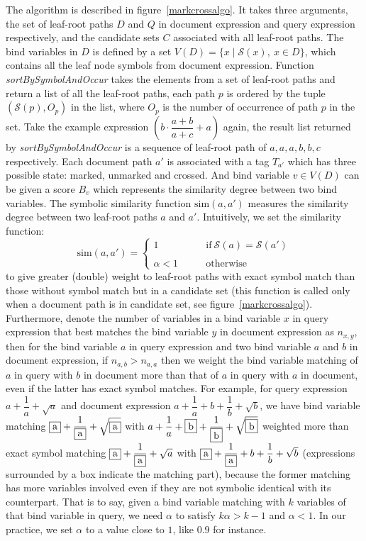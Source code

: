 The algorithm is described in figure~\ref{markcrossalgo}. It takes three arguments, the set of leaf-root paths $D$ and $Q$ in document expression and query expression respectively, and the candidate sets $C$ associated with all leaf-root paths. 
The bind variables in $D$ is defined by a set $V(D) = \{x \mid \mathcal{S}(x),\ x \in D\}$, which contains all the leaf node symbols from document expression.
Function \textit{sortBySymbolAndOccur} takes the elements from a set of leaf-root paths and return a list of all the leaf-root paths, each path $p$ is ordered by the tuple $(\mathcal{S}(p), O_p)$ in the list, where $O_p$ is the number of occurrence of path $p$ in the set. 
Take the example expression $\left(b \cdot \dfrac{a+b}{a+c} + a\right)$ again, the result list returned by \textit{sortBySymbolAndOccur} is a sequence of leaf-root path of $a,a,a,b,b,c$ respectively.
Each document path $a'$ is associated with a tag $T_{a'}$ which has three possible state: marked, unmarked and crossed. And bind variable $v \in V(D)$ can be given a score $B_v$ which represents the similarity degree between two bind variables. 
The symbolic similarity function $\mathrm{sim}(a,a')$ measures the similarity degree between two leaf-root paths $a$ and $a'$. 
Intuitively, we set the similarity function:
$$
\mathrm{sim}(a,a') = 
\left\{
\begin{array}{ll}
1    &\qquad \mathrm{if}\  \mathcal{S}(a) = \mathcal{S}(a')
\\
\\
\alpha < 1  &\qquad \mathrm{otherwise}
\end{array}
\right.
$$
to give greater (double) weight to leaf-root paths with exact symbol match than those without symbol match but in a candidate set
(this function is called only when a document path is in candidate set, see figure~\ref{markcrossalgo}).
Furthermore, denote the number of variables in a bind variable $x$ in query expression that best matches the bind variable $y$ in document expression as $n_{x,y}$, 
then for the bind variable $a$ in query expression and two bind variable $a$ and $b$ in document expression, if $n_{a,b} > n_{a,a}$ then we weight the bind variable matching of $a$ in query with $b$ in document more than that of $a$ in query with $a$ in document, even if the latter has exact symbol matches.
For example, for query expression $a+\dfrac 1 a + \sqrt{a}$ and document expression $a+\dfrac 1 a + b + \dfrac 1 b + \sqrt{b}$, we have bind variable matching $\fbox{a}+\dfrac 1 {\fbox{a}} + \sqrt{\fbox{a}}$ with $a+\dfrac 1 a + \fbox{b} + \dfrac 1 {\fbox{b}} + \sqrt{\fbox{b}}$ weighted more than exact symbol matching $\fbox{a}+\dfrac 1 {\fbox{a}} + \sqrt{a}$ with $\fbox{a}+\dfrac 1 {\fbox{a}} + b + \dfrac 1 b + \sqrt{b}$
(expressions surrounded by a box indicate the matching part),
because the former matching has more variables involved even if they are not symbolic identical with its counterpart. 
That is to say, given a bind variable matching with $k$ variables of that bind variable in query, we need $\alpha$ to satisfy $ k \alpha > k-1 $
and $\alpha < 1$. In our practice, we set $\alpha$ to a value close to $1$, like $0.9$ for instance.

